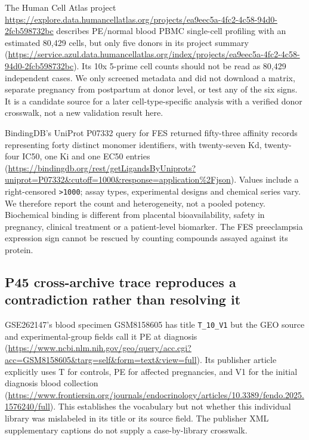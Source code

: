 \documentclass[11pt,a4paper]{article}
\begin{document}
The Human Cell Atlas project \url{https://explore.data.humancellatlas.org/projects/ea9eec5a-4fc2-4c58-94d0-2fcb598732bc} describes PE/normal blood PBMC single-cell profiling with an estimated 80,429 cells, but only five donors in its project summary (\url{https://service.azul.data.humancellatlas.org/index/projects/ea9eec5a-4fc2-4c58-94d0-2fcb598732bc}). Its 10x 5-prime cell counts should not be read as 80,429 independent cases. We only screened metadata and did not download a matrix, separate pregnancy from postpartum at donor level, or test any of the six signs. It is a candidate source for a later cell-type-specific analysis with a verified donor crosswalk, not a new validation result here.

BindingDB's UniProt P07332 query for FES returned fifty-three affinity records representing forty distinct monomer identifiers, with twenty-seven Kd, twenty-four IC50, one Ki and one EC50 entries (\url{https://bindingdb.org/rest/getLigandsByUniprots?uniprot=P07332&cutoff=1000&response=application%2Fjson}). Values include a right-censored \texttt{>1000}; assay types, experimental designs and chemical series vary. We therefore report the count and heterogeneity, not a pooled potency. Biochemical binding is different from placental bioavailability, safety in pregnancy, clinical treatment or a patient-level biomarker. The FES preeclampsia expression sign cannot be rescued by counting compounds assayed against its protein.

\subsection{P45 cross-archive trace reproduces a contradiction rather than resolving it}
GSE262147's blood specimen GSM8158605 has title \texttt{T\_10\_V1} but the GEO source and experimental-group fields call it PE at diagnosis (\url{https://www.ncbi.nlm.nih.gov/geo/query/acc.cgi?acc=GSM8158605&targ=self&form=text&view=full}). Its publisher article explicitly uses T for controls, PE for affected pregnancies, and V1 for the initial diagnosis blood collection (\url{https://www.frontiersin.org/journals/endocrinology/articles/10.3389/fendo.2025.1576240/full}). This establishes the vocabulary but not whether this individual library was mislabeled in its title or its source field. The publisher XML supplementary captions do not supply a case-by-library crosswalk.
\end{document}
